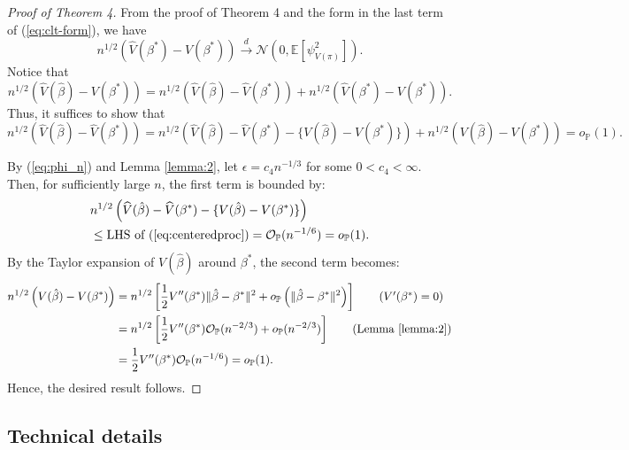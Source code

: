 \documentclass{article}
\newcommand{\wh}{\widehat}
\newcommand{\pr}{\mathbb{P}}
\begin{document}
\begin{proof}[Proof of Theorem 4]
From the proof of Theorem 4 and the form in the last term of (\ref{eq:clt-form}), we have
\[
n^{1/2} \left( \wh V(\beta^*) - V(\beta^*) \right) \overset{d}\to \mathcal N\left( 0, \mathbb E[ \psi_{V(\pi)}^2 ] \right).
\]
Notice that
\[
n^{1/2} \left( \wh V(\hat\beta) - V(\beta^*) \right) = n^{1/2} \left( \wh V(\hat\beta) - \wh V(\beta^*) \right) + n^{1/2} \left( \wh V(\beta^*) - V(\beta^*) \right).
\]
Thus, it suffices to show that 
\[
n^{1/2} \left( \wh V(\hat\beta) - \wh V(\beta^*) \right) = n^{1/2} \left( \wh V(\hat\beta) - \wh V(\beta^*) - \{V(\hat\beta) - V(\beta^*)\} \right) + n^{1/2} \left( V(\hat\beta) - V(\beta^*) \right) = o_{\pr}(1).
\]

By (\ref{eq:phi_n}) and Lemma \ref{lemma:2}, let $\epsilon = c_4 n^{-1/3}$ for some $0 < c_4 < \infty$. Then, for sufficiently large $n$, the first term is bounded by:
\begin{align*}
	&n^{1/2} \left( \wh V(\hat\beta) - \wh V(\beta^*) - \{V(\hat\beta) - V(\beta^*)\} \right) \\
	&\le \text{LHS of (\ref{eq:centeredproc})} = \mathcal O_{\pr}(n^{-1/6}) = o_{\pr}(1).
\end{align*}
By the Taylor expansion of $V(\hat\beta)$ around $\beta^*$, the second term becomes:
\begin{align*}
	n^{1/2} \left( V(\hat\beta) - V(\beta^*) \right)
	&= n^{1/2} \left[ \frac12 V''(\beta^*)\|\hat\beta - \beta^*\|^2 + o_{\pr}\left( \|\hat\beta - \beta^*\|^2 \right) \right]  
	  \tag{$V'(\beta^*) = 0$} \\
	&= n^{1/2} \left[ \frac12 V''(\beta^*) \mathcal O_{\pr}(n^{-2/3}) + o_{\pr}( n^{-2/3} ) \right] 
	  \tag{Lemma \ref{lemma:2}} \\
	&= \frac12 V''(\beta^*) \mathcal O_{\pr}(n^{-1/6}) = o_{\pr}(1).
\end{align*}
Hence, the desired result follows.

\end{proof}




%
%
\subsection{Technical details}\label{App:A2}
%
\end{document}
